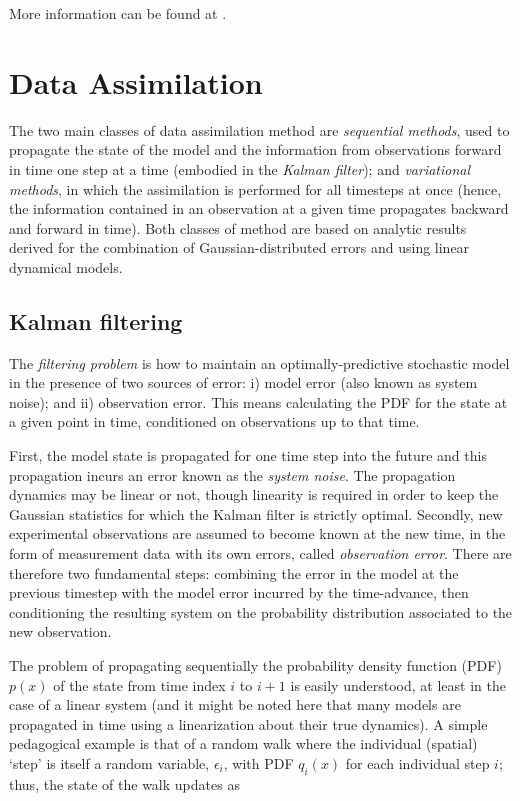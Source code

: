 More information can be found at \cite{pymorwebsite}.

\section{Data Assimilation} \label{DataAssimilation}

The two main classes of data assimilation method are {\it sequential methods}, used to propagate the state of the model and the information from observations forward in time one step at a time (embodied in the {\it Kalman filter}); and {\it variational methods}, in which the assimilation is performed for all timesteps at once (hence, the information contained in an observation at a given time propagates backward and forward in time).  
Both classes of method are based on analytic results derived for the combination of Gaussian-distributed errors and using linear dynamical models.

\subsection{Kalman filtering}

The {\it filtering problem} is how to maintain an optimally-predictive stochastic model in the presence of two sources of error: i) model error (also known as system noise); and ii) observation error.  
This means calculating the PDF for the state at a given point in time, conditioned on observations up to that time.  

First, the model state is propagated for one time step into the future and this propagation incurs an error known as the {\it system noise}.  
The propagation dynamics may be linear or not, though linearity is required in order to keep the Gaussian statistics for which the Kalman filter is strictly optimal.  Secondly, new experimental observations are assumed to become known at the new time, in the form of measurement data with its own errors, called {\it observation error}.  
There are therefore two fundamental steps: combining the error in the model at the previous timestep with the model error incurred by the time-advance, then conditioning the resulting system on the probability distribution associated to the new observation.

The problem of propagating sequentially the probability density function (PDF) $p(x)$ of the state from time index $i$ to $i+1$ is easily understood, at least in the case of a linear system (and it might be noted here that many models are propagated in time using a linearization about their true dynamics).  
A simple pedagogical example is that of a random walk where the individual (spatial) `step' is itself a random variable, $\epsilon_i$, with PDF $q_i(x)$ for each individual step $i$; thus, the state of the walk updates as

